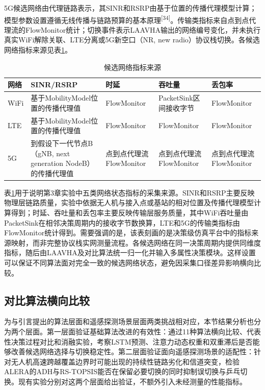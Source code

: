 \documentclass[10pt,a4paper]{ctexart}
\newcommand{\upcite}[1]{\textsuperscript{[#1]}}
\begin{document}
5G候选网络由代理链路表示，其SINR和RSRP由基于位置的传播代理模型计算；模型参数设置遵循无线传播与链路预算的基本原理\upcite{34}。传输类指标来自点到点代理流的FlowMonitor统计；切换事件表示LAAVHA输出的网络编号变化，并未执行真实WiFi解除关联、LTE分离或5G新空口（NR, new radio）协议栈切换。各候选网络指标来源见表\ref{tab:metrics}。

\begin{table}[H]
\centering
\caption{候选网络指标来源}
\small
\begin{tabular}{p{1.5cm}p{3.2cm}p{2.8cm}p{3cm}p{2.5cm}}
\toprule
网络 & SINR/RSRP & 时延 & 吞吐量 & 丢包率 \\
\midrule
WiFi & 基于MobilityModel位置的传播代理值 & FlowMonitor & PacketSink区间接收字节 & FlowMonitor \\
LTE & 基于MobilityModel位置的传播代理值 & FlowMonitor & FlowMonitor & FlowMonitor \\
5G & 到假设下一代节点B（gNB, next generation NodeB）的传播代理值 & 点到点代理流FlowMonitor & 点到点代理流FlowMonitor & 点到点代理流FlowMonitor \\
\bottomrule
\end{tabular}
\label{tab:metrics}
\end{table}

表\ref{tab:metrics}用于说明第3章实验中五类网络状态指标的采集来源。SINR和RSRP主要反映物理层链路质量，实验中依据无人机与接入点或基站的相对位置及传播代理模型计算得到；时延、吞吐量和丢包率主要反映传输层服务质量，其中WiFi吞吐量由PacketSink在相邻决策周期内的接收字节数换算，LTE和5G的传输类指标由FlowMonitor统计得到。需要强调的是，该表刻画的是决策级仿真平台中的指标来源映射，而非完整协议栈实网测量流程。各候选网络在同一决策周期内提供同维度指标，随后由LAAVHA及对比算法统一归一化并输入多属性决策模块。这样设置可以保证不同算法面对完全一致的候选网络状态，避免因采集口径差异影响横向比较。

\subsection{对比算法横向比较}

为与引言提出的算法层面和遥感探测场景层面两类挑战相对应，本节结果分析也分为两个层面。第一层面验证基础算法改进的有效性：通过11种算法横向比较、代表性决策过程对比和消融实验，考察LSTM预测、注意力动态权重和双重滞后是否能够改善候选网络选择与切换稳定性。第二层面验证面向遥感探测场景的适配性：针对无人机高速跨越覆盖边界时可能出现的持续性链路劣化和信道突变，检验ALERA的ADH与RS-TOPSIS能否在保留必要切换的同时抑制误切换与乒乓切换。现有实验分别对这两个层面给出验证，不额外引入未经测量的性能指标。
\end{document}
